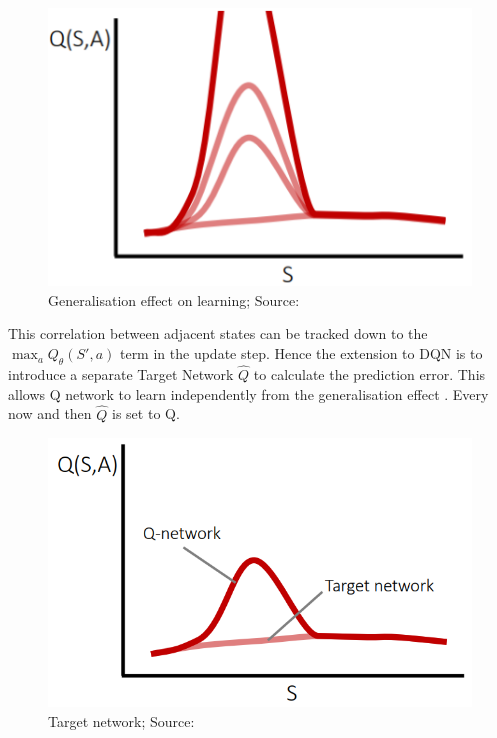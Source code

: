 \begin{figure}[H]
\includegraphics[scale=0.5]{figures/target 4.PNG}
  \caption{Generalisation effect on learning; Source: \cite{lecture_dqn}}
  \label{fig:generalisation_curse}
\end{figure}

This correlation between adjacent states can be tracked down to the $\max_a Q_{\theta}(S', a)$ term in the update step. Hence the 
extension to DQN is to introduce a separate Target Network $\hat{Q}$ to calculate the prediction error. This allows Q network to learn independently from the generalisation effect \cite{lecture_dqn}. Every now and then $\hat{Q}$ is set to Q.

\begin{figure}[H]
\centering
\includegraphics[scale=0.4]{figures/target 0.PNG}
  \caption{Target network; Source: \cite{lecture_dqn}}
  \label{fig:target_network}
\end{figure}


